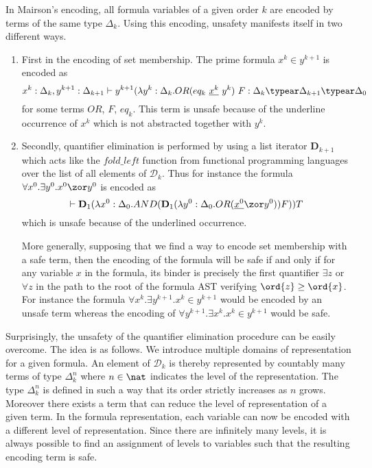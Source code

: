 In Mairson's encoding, all formula variables of a given order $k$ are encoded by terms of the same type $\Delta_k$. Using this encoding,
unsafety manifests itself in two different ways.
\begin{enumerate}[1.]
  \item
        First in the encoding of set membership. The prime formula $x^k \in y^{k+1}$ is encoded as \begin{equation} x^k : \Delta_k, y^{k+1}:\Delta_{k+1} \vdash y^{k+1} (\lambda y^k : \Delta_k . OR (eq_k~\underline{x^k}~y^k)~F : \Delta_k \typear \Delta_{k+1} \typear \Delta_0 \label{eqn:setmembership}\end{equation}
for some terms $OR$, $F$, $eq_k$.
This term is unsafe because of the underline occurrence of $x^k$ which is not abstracted together with $y^k$.

\item Secondly, quantifier elimination is performed by using a list iterator $\mathbf{D}_{k+1}$ which acts like the $fold\_left$ function from functional programming languages over the list of all elements of $\mathcal{D}_k$.
Thus for instance the formula $\forall x^0 . \exists y^0 . x^0 \zor y^0$
is encoded as $$\vdash \mathbf{D}_1 (\lambda x^0:\Delta_0. AND (\mathbf{D}_1 (\lambda y^0:\Delta_0. OR (\underline{x^0} \zor y^0)) F)) T$$ which is unsafe because of the underlined occurrence.

More generally, supposing that we find a way to encode set membership with a safe term, then the encoding of the formula will be safe if and only if for any variable $x$ in the formula, its binder is precisely the first quantifier $\exists z$ or $\forall z$ in the path to the root of the formula AST verifying $\ord{z} \geq \ord{x}$. For instance the formula $\forall x^k . \exists y^{k+1} . x^k \in y^{k+1}$ would be encoded by an unsafe term whereas the encoding of $\forall y^{k+1} . \exists x^k . x^k \in y^{k+1}$ would be safe.
\end{enumerate}

Surprisingly, the unsafety of the quantifier elimination procedure can be
easily overcome. The idea is as follows. We introduce multiple domains of representation for a given formula. An element of $\mathcal{D}_k$ is thereby represented by countably many terms of type $\Delta_k^n$ where $n\in\nat$ indicates the level of the representation. The type $\Delta_k^n$ is defined in such a way that its order strictly increases as $n$ grows. Moreover there exists a term that can reduce the level of representation of a given term. In the formula representation, each variable can now be encoded with a different level of representation. Since there are infinitely many levels, it is always possible to find an assignment of levels to variables such that the resulting encoding term is safe.

